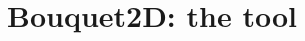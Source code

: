 \documentclass[
	11pt,
	aspectratio=169, %
]{beamer}
\begin{document}

\section{Bouquet2D: the tool}
\end{document}

